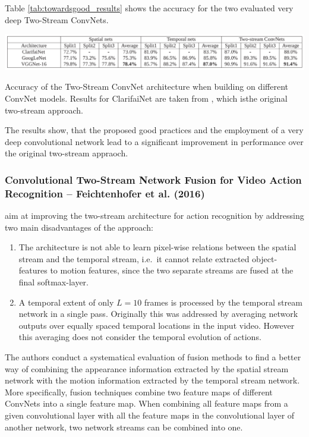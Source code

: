 Table \ref{tab:towardsgood_results} shows the accuracy for the two evaluated very deep Two-Stream ConvNets.

\begin{table}[H]
    \centering
    \includegraphics[width=\textwidth]{img_deep/towardsgood_results}
    \caption{Accuracy of the Two-Stream ConvNet architecture when building on different ConvNet models. Results for ClarifaiNet are taken from \cite{simonyan_two-stream_2014}, which isthe original two-stream approach. \cite{wang_towards_2015}}
    \label{tab:towardsgood_results}
\end{table}

The results show, that the proposed good practices and the employment of a very deep convolutional network lead to a significant improvement in performance over the original two-stream appraoch.


\subsubsection{Convolutional Two-Stream Network Fusion for Video Action Recognition -- Feichtenhofer et al. (2016)}
\cite{feichtenhofer_convolutional_2016}

\textcite{feichtenhofer_convolutional_2016} aim at improving the two-stream architecture for action recognition by addressing two main disadvantages of the approach:
\begin{enumerate}
    \item The architecture is not able to learn pixel-wise relations between the spatial stream and the temporal stream, i.e.\ it cannot relate extracted object-features to motion features, since the two separate streams are fused at the final softmax-layer. 
    \item A temporal extent of only $L = 10$ frames is processed by the temporal stream network in a single pass. Originally this was addressed by averaging network outputs over equally spaced temporal locations in the input video. However this averaging does not consider the temporal evolution of actions.
\end{enumerate}

The authors conduct a systematical evaluation of fusion methods to find a better way of combining the appearance information extracted by the spatial stream network with the motion information extracted by the temporal stream network.
More specifically, fusion techniques combine two feature maps of different ConvNets into a single feature map.
When combining all feature maps from a given convolutional layer with all the feature maps in the convolutional layer of another network, two network streams can be combined into one.

